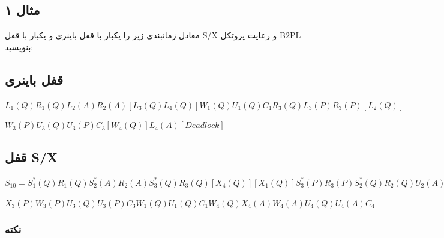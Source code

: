 \documentclass[a4paper]{article}
\begin{document}
\subsection*{مثال ۱}

معادل زمانبندی زیر را یکبار با قفل باینری و یکبار با قفل S/X و رعایت پروتکل B2PL
بنویسید:

\begin{LTR}
    \begin{table}[h]
        \begin{RTL}
            \caption{زمانبندی $S_{10}$}
        \end{RTL}
        \centering
    \end{table}
\end{LTR}

\subsection*{قفل باینری}

\begin{LTR}
\centering
$L_1(Q)R_1(Q)L_2(A)R_2(A)[L_3(Q)L_4(Q)]W_1(Q)U_1(Q)C_1R_3(Q)L_3(P)R_3(P)[L_2(Q)]$

$W_3(P)U_3(Q)U_3(P)C_3[W_4(Q)]L_4(A)[Deadlock]$
\end{LTR}

\subsection*{قفل S/X}

\begin{LTR}
\centering
$S_10 = S_1^*(Q)R_1(Q) S_2^*(A)R_2(A) S_3^*(Q)R_3(Q) [X_4(Q)][X_1(Q)]S_3^*(P)R_3(P) S_2^*(Q)R_2(Q) U_2(A)U_2(Q)C2$

$X_3(P)W_3(P) U_3(Q)U_3(P)C_3W_1(Q)U_1(Q)C_1W_4(Q)X_4(A)W_4(A)U_4(Q)U_4(A)C_4$
\end{LTR}

\subsubsection*{نکته}
\end{document}
